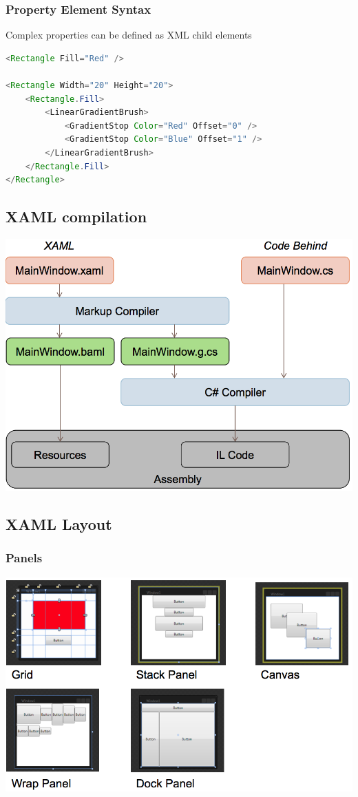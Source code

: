 \documentclass[10pt]{article}
\begin{document}
\subsubsection{Property Element Syntax}
Complex properties can be defined as XML child elements
\begin{lstlisting}[language=Java, caption=Property Element Syntax, style=JavaStyle]
<Rectangle Fill="Red" />

<Rectangle Width="20" Height="20">
	<Rectangle.Fill>
		<LinearGradientBrush>
			<GradientStop Color="Red" Offset="0" />
			<GradientStop Color="Blue" Offset="1" />
		</LinearGradientBrush>
	</Rectangle.Fill>
</Rectangle>
\end{lstlisting}
\subsection{XAML compilation}
\begin{center}
	\includegraphics[scale=0.2]{xaml_compilation.png}
\end{center}
\subsection{XAML Layout}
\subsubsection{Panels}
\begin{center}
	\includegraphics[scale=0.2]{xaml_panels.png}
\end{center}
\end{document}
